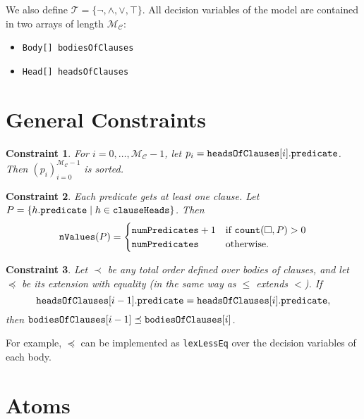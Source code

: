 \documentclass[runningheads]{llncs}
\newtheorem{constraint}{Constraint}
\newcommand{\variable}[1]{\texttt{\textup{#1}}}
\newcommand{\tokens}{\mathcal{T}}
\newcommand{\maxNumClauses}{\mathcal{M}_{\mathcal{C}}}
\begin{document}
We also define $\tokens{} = \{ \neg, \land, \lor, \top \}$. All decision
variables of the model are contained in two arrays of length $\maxNumClauses{}$:
\begin{itemize}
\item \variable{Body[] bodiesOfClauses}
\item \variable{Head[] headsOfClauses}
\end{itemize}

\section{General Constraints}

\begin{constraint}
  For $i = 0, \dots, \maxNumClauses - 1$, let $p_i =
  \variable{headsOfClauses}[i].\variable{predicate}$. Then
  $(p_i)_{i=0}^{\maxNumClauses - 1}$ is sorted.
\end{constraint}

\begin{constraint}
  Each predicate gets at least one clause. Let $P = \{ h.\variable{predicate}
  \mid h \in \variable{clauseHeads} \}$. Then
  \[
    \variable{nValues}(P) =
    \begin{cases}
      \variable{numPredicates} + 1 & \text{if } \variable{count}(\Box, P) > 0 \\
      \variable{numPredicates} & \text{otherwise.}
    \end{cases}
  \]
\end{constraint}

\begin{constraint}
  Let $\prec$ be any total order defined over bodies of clauses, and let
  $\preceq$ be its extension with equality (in the same way as $\le$ extends
  $<$). If
  \[
    \variable{headsOfClauses}[i-1].\variable{predicate} =
    \variable{headsOfClauses}[i].\variable{predicate},
  \]
  then $\variable{bodiesOfClauses}[i-1] \preceq \variable{bodiesOfClauses}[i]$.
\end{constraint}
For example, $\preceq$ can be implemented as \variable{lexLessEq} over the
decision variables of each body.

\section{Atoms} %

\end{document}
